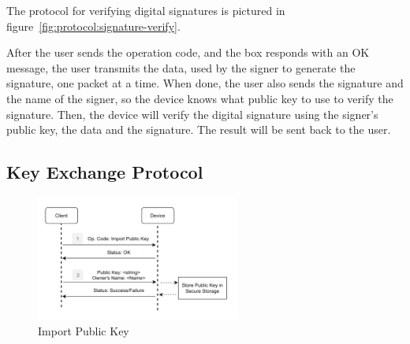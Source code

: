 The protocol for verifying digital signatures is pictured in figure~\ref{fig:protocol:signature-verify}.

After the user sends the operation code, and the box responds with an OK message, the user transmits the data, used by the signer to generate the signature, one packet at a time.
When done, the user also sends the signature and the name of the signer, so the device knows what public key to use to verify the signature.
Then, the device will verify the digital signature using the signer's public key, the data and the signature. The result will be sent back to the user.

\subsection{Key Exchange Protocol}\label{chap:solution:protocol:key}

\begin{figure}[h]
	\centering
	\includegraphics[width=0.6\textwidth]{./Images/import-pub-key.png}
	\caption{Import Public Key}\label{fig:protocol:import-pub}
\end{figure}

